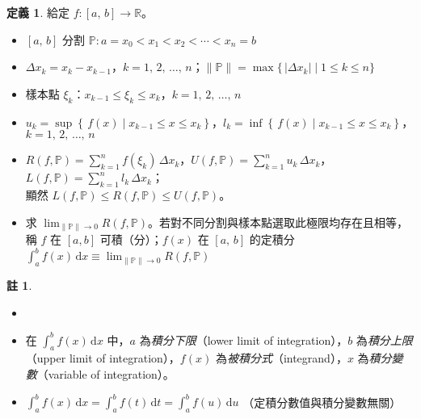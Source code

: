 \documentclass[12pt]{extarticle}
\newcommand{\ds}{\displaystyle}
\theoremstyle{definition}
\newtheorem*{dfn}{定義}
\newtheorem*{rmk}{註}
\begin{document}
\begin{dfn}
  給定 $f:[a,\,b]\to\mathbb{R}$。
  \begin{itemize}\setlength{\itemsep}{0pt}
    \item $[a,\,b]$ 分割 $\ds\mathbb{P}: a = x_0 < x_1 < x_2 < \cdots < x_n = b$
    \item $\ds\Delta x_k=x_k - x_{k-1}$，$k=1,\,2,\,\ldots,\,n$；$\ds\|\mathbb{P}\| = \max\{\,|\Delta x_k|\;|\;1\leqslant k\leqslant n\}$
    \item 樣本點 $\ds\xi_k$：$\ds x_{k-1} \leqslant \xi_k \leqslant x_k$，$k=1,\,2,\,\ldots,\,n$
    \item $\ds u_k = \sup\left\{\,f(x)\;|\;x_{k-1}\leqslant x\leqslant x_k\right\}$，$l_k = \inf\left\{\,f(x)\;|\;x_{k-1}\leqslant x\leqslant x_k\right\}$，$k=1,\,2,\,\ldots,\,n$
    \item $\ds R(f,\mathbb{P}) = \sum_{k=1}^n f(\xi_k)\,\Delta x_k$，$\ds U(f,\mathbb{P}) = \sum_{k=1}^n u_k\,\Delta x_k$，$\ds L(f,\mathbb{P}) = \sum_{k=1}^n l_k\,\Delta x_k$；\\顯然 $\ds L(f,\mathbb{P})\leqslant R(f,\mathbb{P})\leqslant U(f, \mathbb{P})$。
    \item 求 $\ds\lim_{\|\mathbb{P}\|\to 0} R(f,\mathbb{P})$。若對不同分割與樣本點選取此極限均存在且相等，稱 $f$ 在 $[a, b]$ 可積（分）；$f(x)$ 在 $[a,\,b]$ 的定積分 $\ds\int_a^b f(x)\,\mathrm{d}x \equiv \lim_{\|\mathbb{P}\|\to 0} R(f,\mathbb{P})$
  \end{itemize}
\end{dfn}

\begin{rmk}
  \begin{itemize}\setlength{\itemsep}{0pt}
    \item[]
    \item 在 $\ds\int_a^b f(x)\,\text{d}x$ 中，$a$ 為\emph{積分下限}（lower limit of integration），$b$ 為\emph{積分上限}（upper limit of integration），$f(x)$ 為\emph{被積分式}（integrand），$x$ 為\emph{積分變數}（variable of integration）。
    \item $\ds\int_a^b f(x)\,\text{d}x = \int_a^b f(t)\,\text{d}t = \int_a^b f(u)\,\text{d}u$ （定積分數值與積分變數無關）
  \end{itemize}
\end{rmk}
\end{document}
